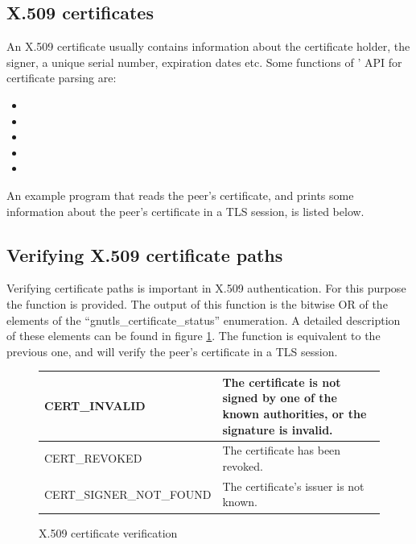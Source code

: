 \subsection{X.509 certificates}
An X.509 certificate usually contains information about the certificate
holder, the signer, a unique serial number, expiration dates etc. Some
functions of \gnutls{}' API for certificate parsing are:
\begin{itemize}
\item {}
\item {}
\item {}
\item {}
\item {}
\end{itemize}

\par
An example program that reads the peer's certificate,
and prints some information about the peer's certificate in a TLS session,
is listed below.




\subsection{Verifying X.509 certificate paths}
Verifying certificate paths is important 
in X.509 authentication. For this purpose the function
 is provided. The
output of this function is the bitwise OR of the elements of the
``gnutls\_certificate\_status'' enumeration. A detailed description of
these elements can be found in figure \ref{fig:verify}.
The function 
is equivalent to the previous one, and will verify the peer's certificate in a TLS session.

\begin{figure}[hbtp]
\begin{tabular}{|l|p{9cm}|}

\hline
CERT\_INVALID & The certificate is not signed by one of the known authorities, or
the signature is invalid.
\\
\hline
CERT\_REVOKED & The certificate has been revoked.
\\
\hline
CERT\_SIGNER\_NOT\_FOUND & The certificate's issuer is not known.
\\
\hline
\end{tabular}
\caption{X.509 certificate verification}
\label{fig:verify}
\end{figure}

